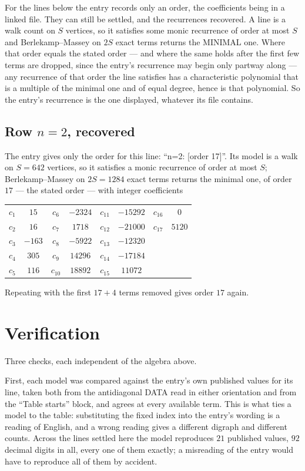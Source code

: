\documentclass[11pt,a4paper]{article}
\theoremstyle{plain}
\theoremstyle{definition}
\begin{document}
For the lines below the entry records only an order, the coefficients being in a linked file.
They can still be settled, and the recurrences recovered. A line is a walk count on $S$
vertices, so it satisfies some monic recurrence of order at most $S$ and Berlekamp--Massey on
$2S$ exact terms returns the MINIMAL one. Where that order equals the stated order --- and
where the same holds after the first few terms are dropped, since the entry's recurrence may
begin only partway along --- any recurrence of that order the line satisfies has a
characteristic polynomial that is a multiple of the minimal one and of equal degree, hence is
that polynomial. So the entry's recurrence is the one displayed, whatever its file contains.

\subsection*{Row $n=2$, recovered}
The entry gives only the order for this line: ``n=2: [order 17]''. Its model is a walk on
$S=642$ vertices, so it satisfies a monic recurrence of order at most $S$;
Berlekamp--Massey on $2S=1284$ exact terms returns the minimal one, of order
$17$ --- the stated order --- with integer coefficients
\begin{center}\small\begin{tabular}{cccccccc}
$c_{1}$ & $15$ & $c_{6}$ & $-2324$ & $c_{11}$ & $-15292$ & $c_{16}$ & $0$ \\
$c_{2}$ & $16$ & $c_{7}$ & $1718$ & $c_{12}$ & $-21000$ & $c_{17}$ & $5120$ \\
$c_{3}$ & $-163$ & $c_{8}$ & $-5922$ & $c_{13}$ & $-12320$ &  &  \\
$c_{4}$ & $305$ & $c_{9}$ & $14296$ & $c_{14}$ & $-17184$ &  &  \\
$c_{5}$ & $116$ & $c_{10}$ & $18892$ & $c_{15}$ & $11072$ &  &  \\
\end{tabular}\end{center}
Repeating with the first $17+4$ terms removed gives order $17$ again.

\section{Verification}

Three checks, each independent of the algebra above.

First, each model was compared against the entry's own published values for its line, taken
both from the antidiagonal DATA read in either orientation and from the ``Table starts''
block, and agrees at every available term. This is what ties a model to the table:
substituting the fixed index into the entry's wording is a reading of English, and a wrong
reading gives a different digraph and different counts. Across the lines settled here the
model reproduces $21$ published values, $92$ decimal digits in all, every one of
them exactly; a misreading of the entry would have to reproduce all of them by accident.
\end{document}
